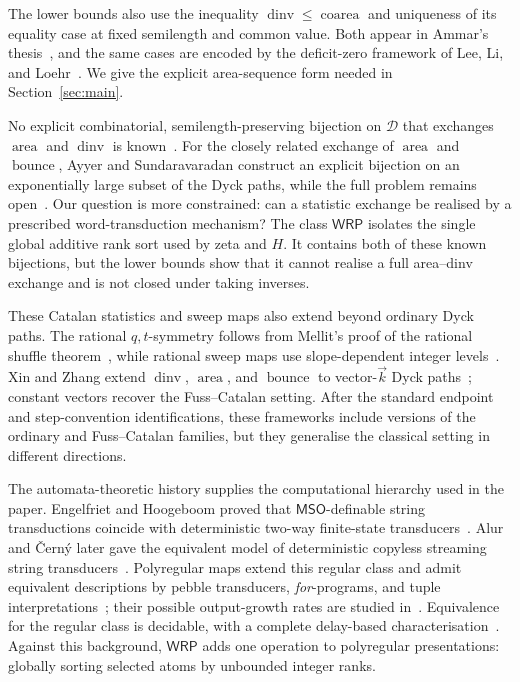 \documentclass[11pt]{article}
\theoremstyle{definition}
\newcommand{\D}{\mathcal D}
\newcommand{\WRP}{\mathsf{WRP}}
\newcommand{\MSO}{\mathsf{MSO}}
\newcommand{\area}{\operatorname{area}}
\newcommand{\dinv}{\operatorname{dinv}}
\newcommand{\bounce}{\operatorname{bounce}}
\newcommand{\coarea}{\operatorname{coarea}}
\begin{document}
The lower bounds also use the inequality $\dinv\le\coarea$ and uniqueness of
its equality case at fixed semilength and common value.  Both appear in
Ammar's thesis~\cite{Ammar2015}, and the same cases are encoded by the
deficit-zero framework of Lee, Li, and Loehr~\cite{LeeLiLoehr2018}.  We give
the explicit area-sequence form needed in Section~\ref{sec:main}.

No explicit combinatorial, semilength-preserving bijection on $\D$ that
exchanges $\area$ and $\dinv$ is known~\cite{Pons2022}.  For the closely related
exchange of $\area$ and $\bounce$, Ayyer and Sundaravaradan construct an
explicit bijection on an exponentially large subset of the Dyck paths, while
the full problem remains open~\cite{AyyerSundaravaradan2025}.  Our question is
more constrained: can a statistic exchange be realised by a prescribed
word-transduction mechanism?  The class $\WRP$ isolates the single global
additive rank sort used by zeta and $H$.  It contains both of these known
bijections, but the lower bounds show that it cannot realise a full
area--dinv exchange and is not closed under taking inverses.

These Catalan statistics and sweep maps also extend beyond ordinary Dyck
paths.  The rational $q,t$-symmetry follows from Mellit's proof of the rational
shuffle theorem~\cite{Mellit2021}, while rational sweep maps use
slope-dependent integer levels~\cite{ArmstrongLoehrWarrington2015,
ArmstrongLoehrWarrington2016,ThomasWilliams2018}.  Xin and Zhang extend
$\dinv$, $\area$, and $\bounce$ to vector-$\vec k$ Dyck
paths~\cite{XinZhang2023}; constant vectors recover the Fuss--Catalan setting.
After the standard endpoint and step-convention identifications, these
frameworks include versions of the ordinary and Fuss--Catalan families, but
they generalise the classical setting in different directions.

The automata-theoretic history supplies the computational hierarchy used in
the paper.  Engelfriet and Hoogeboom proved that $\MSO$-definable string
transductions coincide with deterministic two-way finite-state
transducers~\cite{EngelfrietHoogeboom2001}.  Alur and \v{C}ern\'y later gave
the equivalent model of deterministic copyless streaming string
transducers~\cite{AlurCerny2010}.  Polyregular maps extend this regular class
and admit equivalent descriptions by pebble transducers, \emph{for}-programs,
and tuple interpretations~\cite{Bojanczyk2018,BojanczykKieferLhote2019}; their
possible output-growth rates are studied in~\cite{Bojanczyk2023Growth}.
Equivalence for the regular class is decidable, with a complete delay-based
characterisation~\cite{FiliotJeckerLodingWinter2023}.  Against this background,
$\WRP$ adds one operation to polyregular presentations: globally sorting
selected atoms by unbounded integer ranks.
\end{document}
